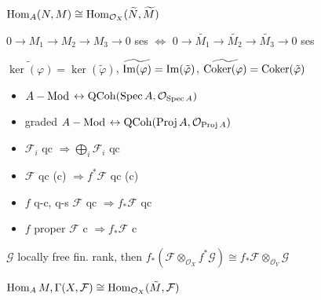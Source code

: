 \begin{proposition}
$\operatorname{Hom}_A(N, M) \cong \operatorname{Hom}_{\mathcal{O}_X}(\widetilde{N}, \widetilde{M})$
\end{proposition}

\begin{proposition}
$0 \to M_1 \to M_2 \to M_3 \to 0$ ses $ \Leftrightarrow $ $0 \to \tilde{M_1} \to \tilde{M_2} \to \tilde{M_3} \to 0$ ses
\end{proposition}

\begin{proposition} 
$\widetilde{\ker (\varphi )} = \ker (\tilde{\varphi })$, 
$\widetilde{\operatorname{Im} (\varphi )} = \operatorname{Im} (\tilde{\varphi })$, 
$\widetilde{\operatorname{Coker} (\varphi )} = \operatorname{Coker} (\tilde{\varphi })$
\end{proposition}

\begin{proposition} 
    \begin{itemize}[topsep=-6pt, itemsep=0pt]
        \item $A-\operatorname{Mod}$ $ \leftrightarrow \operatorname{QCoh}(\operatorname{Spec} A, \mathcal{O}_{\operatorname{Spec} A})$
        \item graded $A-\operatorname{Mod}$ $ \leftrightarrow \operatorname{QCoh}(\operatorname{Proj} A, \mathcal{O}_{\operatorname{Proj} A})$
    \end{itemize}
\end{proposition}

\begin{proposition}
\begin{itemize}[topsep=-6pt, itemsep=0pt]
    \item $\mathcal{F}_i $ qc $ \Rightarrow \bigoplus_i \mathcal{F}_i$ qc
    \item $\mathcal{F} $ qc (c) $ \Rightarrow f^* \mathcal{F} $ qc (c)
    \item $f$ q-c, q-s $\mathcal{F}$ qc $ \Rightarrow f_* \mathcal{F} $ qc
    \item $f$ proper $\mathcal{F}$ c $ \Rightarrow f_* \mathcal{F} $ c
\end{itemize}
\end{proposition}

\begin{proposition} $\mathcal{G}$ locally free fin. rank, then $f_*(\mathcal{F} \otimes _{\mathcal{O}_X } f^* \mathcal{G} ) \cong f_* \mathcal{F} \otimes_{\mathcal{O}_Y }\mathcal{G}$
\end{proposition}

\begin{proposition}
$\operatorname{Hom}_A M, \Gamma (X, \mathcal{F} ) \cong \operatorname{Hom} _{\mathcal{O}_{X} } (\tilde{M}, \mathcal{F} )$
\end{proposition}

